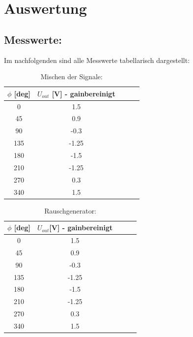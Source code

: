 \section{Auswertung}
\label{sec:Auswertung}

\subsection{Messwerte:}
Im nachfolgenden sind alle Messwerte tabellarisch dargestellt:
\begin{table}
\centering
\caption{Mischen der Signale:}
\label{tab:data2}
\begin{tabular}{S[table-format=3.0] S S S S[table-format=3.2]}
\toprule
{$\phi$ [deg]}  & {$U_{out}$ [V] - gainbereinigt}\\
 & 1.5 \\
45 & 0.9 \\
90 & -0.3 \\
135 & -1.25 \\
180 & -1.5 \\
210 & -1.25 \\
270 & 0.3 \\
340 & 1.5 \\
\bottomrule
\end{tabular}
\end{table}

\begin{table}
\centering
\caption{Rauschgenerator:}
\label{tab:data3}
\begin{tabular}{S[table-format=3.0] S S S S[table-format=3.2]}
\toprule
{$\phi$ [deg]} & {$U_{out}$[V] - gainbereinigt}\\
 & 1.5 \\
45 & 0.9 \\
90 & -0.3 \\
135 & -1.25 \\
180 & -1.5 \\
210 & -1.25 \\
270 & 0.3 \\
340 & 1.5 \\
\bottomrule
\end{tabular}
\end{table}

